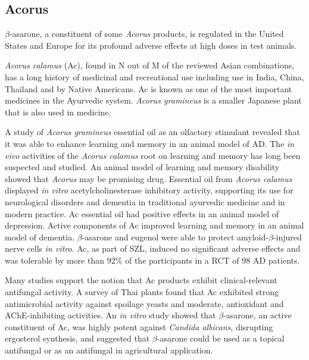 \documentclass[twocolumn]{article}
\begin{document}
\subsection{Acorus}

$\beta$-asarone, a constituent of some
\textit{Acorus} products,
is regulated in the United States and Europe
for its profound adverse effects
at high doses in test animals.
\cite{EC2002directorate}

\textit{Acorus calamus} (Ac),
found in N out of M of the reviewed Asian combinations,
has a long history of medicinal and recreational use
including use in India, China, Thailand and by Native Americans.
\cite{phongpaichit2005antimicrobial}
Ac is known as one of the most important medicines in
the Ayurvedic system.
\cite{kumar2013medicinal}
\textit{Acorus gramineus} is a smaller Japanese plant
that is also used in medicine.

A study of \textit{Acorus gramineus}
essential oil as an olfactory stimulant revealed that it was
able to enhance learning and memory in an animal model of AD.
\cite{liu2010study}
The \textit{in vivo} activities of the
\textit{Acorus calamus} root on learning and memory
has long been suspected and studied.
An animal model of learning and memory disability
showed that \textit{Acorus} may be promising drug.
\cite{wenling1993facilitatory}
Essential oil from \textit{Acorus calamus}
displayed \textit{in vitro}
acetylcholinesterase inhibitory activity,
supporting its use for neurological disorders
and dementia in traditional ayurvedic medicine
and in modern practice.
\cite{mukherjee2007vitro}
Ac essential oil had positive effects
in an animal model of depression.
\cite{han2013antidepressant}
Active components of Ac improved learning and memory in
an animal model of dementia.
\cite{guo2012effects}
$\beta$-asarone and eugenol were able to
protect amyloid-$\beta$-injured nerve cells \textit{in vitro}.
\cite{jiang2006protective}
Ac, as part of SZL,
induced no significant adverse effects
and was tolerable by more than 92\% of the participants
in a RCT of 98 AD patients.
\cite{pan2014shen}

Many studies support the notion that Ac products exhibit clinical-relevant
antifungal activity.
A survey of Thai plants found that Ac
exhibited strong antimicrobial activity against spoilage yeasts
and moderate, antioxidant and AChE-inhibiting activities.
\cite{nanasombat2014antimicrobial}
An \textit{in vitro} study showed that $\beta$-asarone,
an active constituent of Ac,
was highly potent against \textit{Candida albicans},
disrupting ergosterol synthesis,
and suggested that $\beta$-asarone could be used as a topical
antifungal
\cite{rajput2013beta}
or as an antifungal in agricultural application.
\cite{lee2004antifungal}
\end{document}
